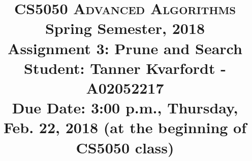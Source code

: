 \documentclass[11pt]{article}
\begin{document}
\baselineskip=14.0pt

\title{CS5050 \textsc{Advanced Algorithms}
\\{\Large Spring Semester, 2018}
\\ Assignment 3: Prune and Search
\\ {\large \textbf{Student:} Tanner Kvarfordt - A02052217}
\\ {\large {\bf Due Date: 3:00 p.m.}, Thursday, Feb. 22, 2018 ({\bf at the beginning of CS5050 class})}}
\date{}

\maketitle

\vspace{-0.7in}
\end{document}
